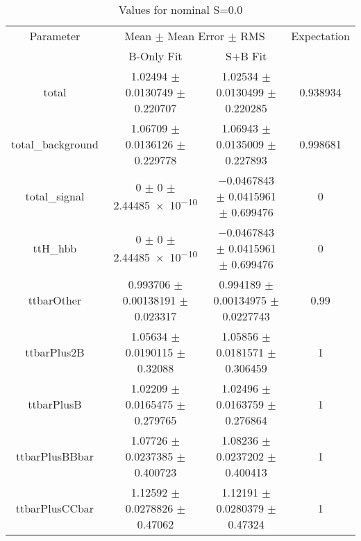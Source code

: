 \begin{table}
\centering
\caption{Values for nominal S=0.0}
\begin{tabular}{cccc}
\toprule
Parameter & \multicolumn{2}{c}{Mean $\pm$ Mean Error $\pm$ RMS} & Expectation\\
 & B-Only Fit & S+B Fit & \\
\midrule
total & \num{1.02494} $\pm$ \num{0.0130749} $\pm$ \num{0.220707} & \num{1.02534} $\pm$ \num{0.0130499} $\pm$ \num{0.220285} & \num{0.938934}\\
total\_background & \num{1.06709} $\pm$ \num{0.0136126} $\pm$ \num{0.229778} & \num{1.06943} $\pm$ \num{0.0135009} $\pm$ \num{0.227893} & \num{0.998681}\\
total\_signal & \num{0} $\pm$ \num{0} $\pm$ \num{2.44485e-10} & \num{-0.0467843} $\pm$ \num{0.0415961} $\pm$ \num{0.699476} & \num{0}\\
ttH\_hbb & \num{0} $\pm$ \num{0} $\pm$ \num{2.44485e-10} & \num{-0.0467843} $\pm$ \num{0.0415961} $\pm$ \num{0.699476} & \num{0}\\
ttbarOther & \num{0.993706} $\pm$ \num{0.00138191} $\pm$ \num{0.023317} & \num{0.994189} $\pm$ \num{0.00134975} $\pm$ \num{0.0227743} & \num{0.99}\\
ttbarPlus2B & \num{1.05634} $\pm$ \num{0.0190115} $\pm$ \num{0.32088} & \num{1.05856} $\pm$ \num{0.0181571} $\pm$ \num{0.306459} & \num{1}\\
ttbarPlusB & \num{1.02209} $\pm$ \num{0.0165475} $\pm$ \num{0.279765} & \num{1.02496} $\pm$ \num{0.0163759} $\pm$ \num{0.276864} & \num{1}\\
ttbarPlusBBbar & \num{1.07726} $\pm$ \num{0.0237385} $\pm$ \num{0.400723} & \num{1.08236} $\pm$ \num{0.0237202} $\pm$ \num{0.400413} & \num{1}\\
ttbarPlusCCbar & \num{1.12592} $\pm$ \num{0.0278826} $\pm$ \num{0.47062} & \num{1.12191} $\pm$ \num{0.0280379} $\pm$ \num{0.47324} & \num{1}\\
\bottomrule
\end{tabular}
\end{table}